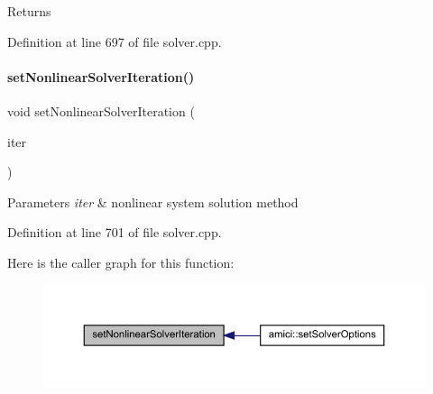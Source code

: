 \begin{DoxyReturn}{Returns}

\end{DoxyReturn}


Definition at line 697 of file solver.\+cpp.

\mbox{\label{classamici_1_1_solver_a1dc7983f545ee95f7e6fb38cfb0b3286}} 
\paragraph{\texorpdfstring{set\+Nonlinear\+Solver\+Iteration()}{setNonlinearSolverIteration()}}
{\footnotesize\ttfamily void set\+Nonlinear\+Solver\+Iteration (\begin{DoxyParamCaption}\item[{\mbox{\hyperlink{namespaceamici_a13388d34e4c35bb592c3e821c35cc923}{Nonlinear\+Solver\+Iteration}}}]{iter }\end{DoxyParamCaption})}


\begin{DoxyParams}{Parameters}
{\em iter} & nonlinear system solution method \\
\hline
\end{DoxyParams}


Definition at line 701 of file solver.\+cpp.

Here is the caller graph for this function\+:
\nopagebreak
\begin{figure}[H]
\begin{center}
\leavevmode
\includegraphics[width=350pt]{classamici_1_1_solver_a1dc7983f545ee95f7e6fb38cfb0b3286_icgraph}
\end{center}
\end{figure}
\mbox{\label{classamici_1_1_solver_a69568ccb5de1bcdd4344e105ddb12324}} 
